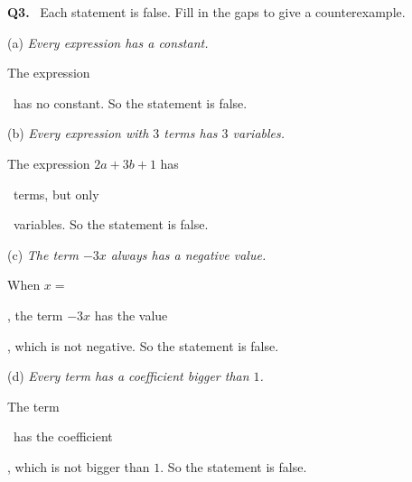 \documentclass[14pt,a4paper]{extarticle}
\newcommand{\qn}[1]{\textbf{Q#1.}\ }
\newcommand{\gapstrut}{\rule[-1.5mm]{0pt}{7.5mm}}
\newcommand{\gap}{\gapstrut\underline{\hspace{1.4cm}}}
\newcommand{\wgap}{\gapstrut\underline{\hspace{3.4cm}}}
\begin{document}
\vfill
\qn{3} Each statement is false. Fill in the gaps to give a
counterexample.

\vspace{6pt}
(a) \textit{Every expression has a constant.}\par
The expression \wgap\ has no constant. So the statement is false.

\vspace{8pt}
(b) \textit{Every expression with $3$ terms has $3$ variables.}\par
The expression $2a+3b+1$ has \gap\ terms, but only \gap\ variables.
So the statement is false.

\vspace{8pt}
(c) \textit{The term $-3x$ always has a negative value.}\par
When $x=$ \gap, the term $-3x$ has the value \gap, which is not
negative. So the statement is false.

\vspace{8pt}
(d) \textit{Every term has a coefficient bigger than $1$.}\par
The term \gap\ has the coefficient \gap, which is not bigger than $1$.
So the statement is false.
\vfill

\newpage
\end{document}
